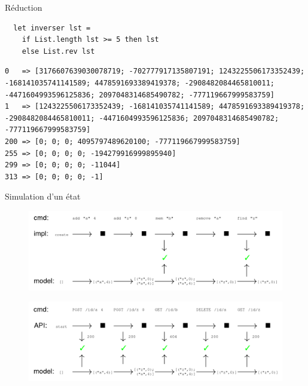 \begin{frame}[fragile]{Réduction}
    
\begin{lstlisting}
  let inverser lst = 
    if List.length lst >= 5 then lst
    else List.rev lst
\end{lstlisting}
\begin{lstlisting}
0   => [3176607639030078719; -702777917135807191; 1243225506173352439; -168141035741141589; 4478591693389419378; -2908482084465810011; -4471604993596125836; 2097048314685490782; -777119667999583759]
1   => [1243225506173352439; -168141035741141589; 4478591693389419378; -2908482084465810011; -4471604993596125836; 2097048314685490782; -777119667999583759]
200 => [0; 0; 0; 4095797489620100; -777119667999583759]
255 => [0; 0; 0; 0; -194279916999895940]
299 => [0; 0; 0; 0; -11044]
313 => [0; 0; 0; 0; -1]
\end{lstlisting}

\end{frame}

\begin{frame}{Simulation d'un état}

\begin{figure}
\centering
\includegraphics[width=\textwidth]{slides/images/qcheck_state.png}
\end{figure}
\begin{figure}
\centering
\includegraphics[width=\textwidth]{slides/images/qcheck_state_2.png}
\end{figure}

\end{frame}